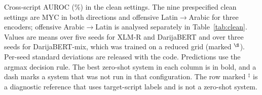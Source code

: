 \begin{table}[t]
\caption{Cross-script AUROC (\%) in the clean settings. The nine prespecified clean settings are MYC in both directions and offensive Latin$\to$Arabic for three encoders; offensive Arabic$\to$Latin is analysed separately in Table~\ref{tab:clean}. Values are means over five seeds for XLM-R and DarijaBERT and over three seeds for DarijaBERT-mix, which was trained on a reduced grid (marked $^{\S}$). Per-seed standard deviations are released with the code. Predictions use the argmax decision rule. The best zero-shot system in each column is in bold, and a dash marks a system that was not run in that configuration. The row marked $^{\ddagger}$ is a diagnostic reference that uses target-script labels and is not a zero-shot system.}
\label{tab:auc}
\centering\footnotesize
\setlength{\tabcolsep}{3.2pt}
\fitbox{\textwidth}
\end{table}
